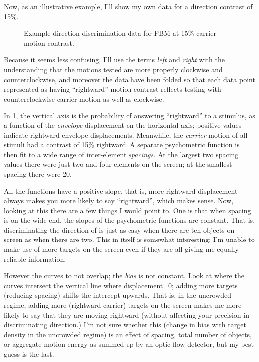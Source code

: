 \documentclass[english,noae]{article}
\begin{document}
Now, as an illustrative example, I'll show my own data for a direction
contrast of 15\%. 

\begin{figure}[h]





\caption{\label{fig:pbm-example}Example direction discrimination data for
PBM at 15\% carrier motion contrast.}
\end{figure}


Because it seems less confusing, I'll use the terms \emph{left} and
\emph{right} with the understanding that the motions tested are more
properly clockwise and counterclockwise, and moreover the data have
been folded so that each data point represented as having ``rightward''
motion contrast reflects testing with counterclockwise carrier motion
as well as clockwise.

In \ref{fig:pbm-example}, the vertical axis is the probability of
answering ``rightward'' to a stimulus, as a function of the \emph{envelope}
displacement on the horizontal axis; positive values indicate rightward
envelope displacements. Meanwhile, the \emph{carrier} motion of all
stimuli had a contrast of 15\% rightward. A separate psychometric
function is then fit to a wide range of inter-element \emph{spacings.
}At the largest two spacing values there were just two and four elements
on the screen; at the smallest spacing there were 20.

All the functions have a positive slope, that is, more rightward displacement
always makes you more likely to say ``rightward'', which makes sense.
Now, looking at this there are a few things I would point to. One
is that when spacing is on the wide end, the slopes of the psychometric
functions are constant. That is, discriminating the direction of is
just as easy when there are ten objects on screen as when there are
two. This in itself is somewhat interesting; I'm unable to make use
of more targets on the screen even if they are all giving me equally
reliable information.

However the curves to not overlap; the \emph{bias} is not constant.\emph{
}Look at where the curves intersect the vertical line where displacement=0;
adding more targets (reducing spacing) shifts the intercept upwards.
That is, in the uncrowded regime, adding more (rightward-carrier)
targets on the screen makes me more likely to say that they are moving
rightward (without affecting your precision in discriminating direction.)
I'm not sure whether this (change in bias with target density in the
uncrowded regime) is an effect of spacing, total number of objects,
or aggregate motion energy as summed up by an optic flow detector,
but my best guess is the last. 
\end{document}

